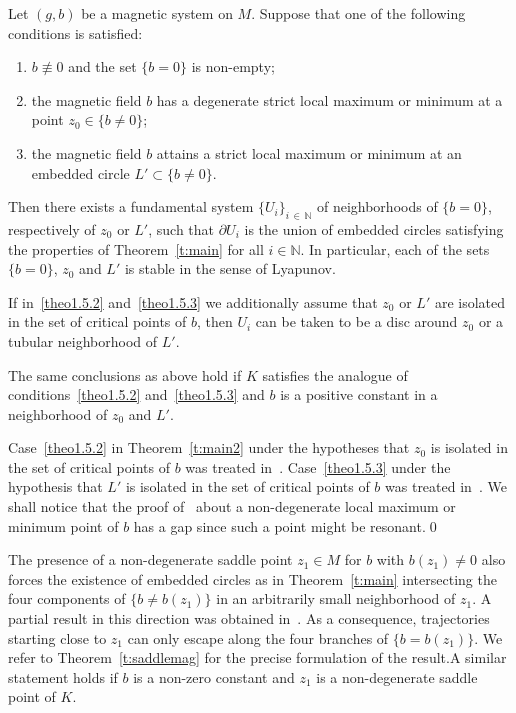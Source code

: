 \documentclass[AHL,Unicode,longabstracts,published]{cedram}
\newcommand{\N}{\mathbb{N}}
\newcommand{\p}{\partial}
\begin{document}
\begin{theo}\label{t:main2}
Let $(g,b)$ be a magnetic system on $M$. Suppose that one of the following conditions is satisfied:
\begin{enumerate}
\item\label{theo1.5.1} $b\not\equiv 0$ and the set $\{b=0\}$ is non-empty;
\item\label{theo1.5.2} the magnetic field $b$ has a degenerate strict local maximum or minimum at a point $z_0\in\{b\neq0\}$;
\item\label{theo1.5.3} the magnetic field $b$ attains a strict local maximum or minimum at an embedded circle $L'\subset\{b\neq0\}$.
\end{enumerate}
Then there exists a fundamental system $\{U_i\}_{i\,\in\,\N}$ of neighborhoods of $\{b=0\}$, respectively of $z_0$ or $L'$, such that $\p U_i$ is the union of embedded circles satisfying the properties of Theorem~\ref{t:main} for all $i\in\N$. In particular, each of the sets $\{b=0\}$, $z_0$ and $L'$ is stable in the sense of Lyapunov.

If in~\eqref{theo1.5.2} and~\eqref{theo1.5.3}  we additionally assume that $z_0$ or $L'$ are isolated in the set of critical points of $b$, then $U_i$ can be taken to be a disc around $z_0$ or a tubular neighborhood of $L'$.

The same conclusions as above hold if $K$ satisfies the analogue of conditions~\eqref{theo1.5.2} and~\eqref{theo1.5.3} and $b$ is a positive constant in a neighborhood of $z_0$ and $L'$.
\end{theo}


\begin{rema}
Case~\eqref{theo1.5.2} in Theorem~\ref{t:main2} under the hypotheses that $z_0$ is isolated in the set of critical points of $b$ was treated in~\cite[Corollary~1.5]{AB21}. Case~\eqref{theo1.5.3} under the hypothesis that $L'$ is isolated in the set of critical points of $b$ was treated in~\cite[Corollary~1.3]{Castilho:2001}. We shall notice that the proof of~\cite[Corollary~1.2]{Castilho:2001} about a non-degenerate local maximum or minimum point of $b$ has a gap since such a point might be resonant.\qed
\end{rema}

\begin{rema}\label{r:saddle}
The presence of a non-degenerate saddle point $z_1\in M$ for $b$ with $b(z_1)\neq0$ also forces the existence of embedded circles as in Theorem~\ref{t:main} intersecting the four components of $\{b\neq b(z_1)\}$ in an arbitrarily small neighborhood of $z_1$. A partial result in this direction was obtained in~\cite[Theorem~1.6]{AB21}. As a consequence, trajectories starting close to $z_1$ can only escape along the four branches of $\{b=b(z_1)\}$. We refer to Theorem~\ref{t:saddlemag} for the precise formulation of the result.\linebreak A similar statement holds if $b$ is a non-zero constant and $z_1$ is a non-degenerate saddle point of $K$.
\end{rema}
\end{document}
